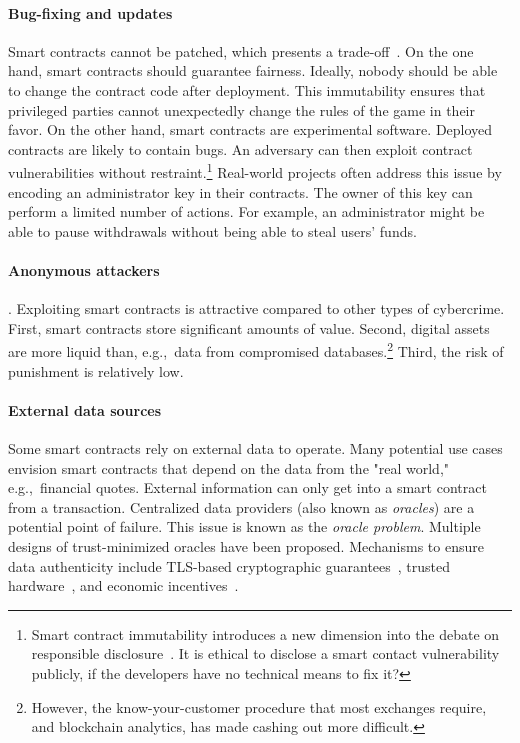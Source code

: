\paragraph{Bug-fixing and updates}
Smart contracts cannot be patched, which presents a trade-off~\cite{Porru2017}.
On the one hand, smart contracts should guarantee fairness.
Ideally, nobody should be able to change the contract code after deployment.
This immutability ensures that privileged parties cannot unexpectedly change the rules of the game in their favor.
On the other hand, smart contracts are experimental software.
Deployed contracts are likely to contain bugs.
An adversary can then exploit contract vulnerabilities without restraint.\footnote{Smart contract immutability introduces a new dimension into the debate on responsible disclosure~\cite{Schneier2007}. It is ethical to disclose a smart contact vulnerability publicly, if the developers have no technical means to fix it?}
Real-world projects often address this issue by encoding an administrator key in their contracts.
The owner of this key can perform a limited number of actions.
For example, an administrator might be able to pause withdrawals without being able to steal users' funds.

\paragraph{Anonymous attackers}.
Exploiting smart contracts is attractive compared to other types of cybercrime.
First, smart contracts store significant amounts of value.
Second, digital assets are more liquid than, e.g.,~data from compromised databases.\footnote{However, the know-your-customer procedure that most exchanges require, and blockchain analytics, has made cashing out more difficult.}
Third, the risk of punishment is relatively low.

\paragraph{External data sources}
Some smart contracts rely on external data to operate.
Many potential use cases envision smart contracts that depend on the data from the "real world," e.g.,~financial quotes.
External information can only get into a smart contract from a transaction.
Centralized data providers (also known as \textit{oracles}) are a potential point of failure.
This issue is known as the \textit{oracle problem}.
Multiple designs of trust-minimized oracles have been proposed.
Mechanisms to ensure data authenticity include TLS-based cryptographic guarantees~\cite{Provable}, trusted hardware~\cite{Zhang2016}, and economic incentives~\cite{Chainlink}.

